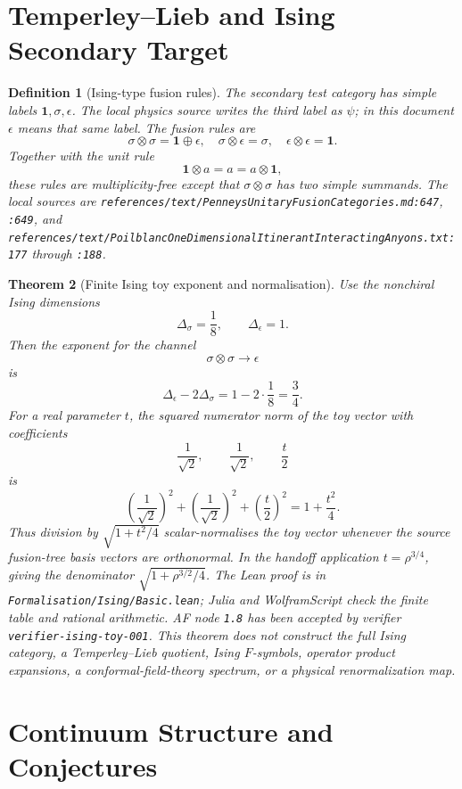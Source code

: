 \documentclass[11pt]{article}
\newtheorem{definition}{Definition}[section]
\newtheorem{theorem}[definition]{Theorem}
\begin{document}
\section{Temperley--Lieb and Ising Secondary Target}

\begin{definition}[Ising-type fusion rules]
The secondary test category has simple labels
\(\mathbf 1,\sigma,\epsilon\). The local physics source writes the third
label as \(\psi\); in this document \(\epsilon\) means that same label. The
fusion rules are
\[
\sigma\otimes\sigma=\mathbf 1\oplus\epsilon,\quad
\sigma\otimes\epsilon=\sigma,\quad
\epsilon\otimes\epsilon=\mathbf 1.
\]
Together with the unit rule
\[
\mathbf 1\otimes a=a=a\otimes \mathbf 1,
\]
these rules are multiplicity-free except that \(\sigma\otimes\sigma\) has two
simple summands. The local sources are
\texttt{references/text/PenneysUnitaryFusionCategories.md:647},
\texttt{:649}, and
\texttt{references/text/PoilblancOneDimensionalItinerantInteractingAnyons.txt:177}
through \texttt{:188}.
\end{definition}

\begin{theorem}[Finite Ising toy exponent and normalisation]
Use the nonchiral Ising dimensions
\[
\Delta_\sigma=\frac18,\qquad \Delta_\epsilon=1.
\]
Then the exponent for the channel
\[
\sigma\otimes\sigma\to\epsilon
\]
is
\[
\Delta_\epsilon-2\Delta_\sigma
=1-2\cdot\frac18=\frac34.
\]
For a real parameter \(t\), the squared numerator norm of the toy vector with
coefficients
\[
\frac{1}{\sqrt 2},\qquad
\frac{1}{\sqrt 2},\qquad
\frac{t}{2}
\]
is
\[
\left(\frac1{\sqrt2}\right)^2+
\left(\frac1{\sqrt2}\right)^2+
\left(\frac{t}{2}\right)^2
=1+\frac{t^2}{4}.
\]
Thus division by \(\sqrt{1+t^2/4}\) scalar-normalises the toy vector whenever
the source fusion-tree basis vectors are orthonormal. In the handoff
application \(t=\rho^{3/4}\), giving the denominator
\(\sqrt{1+\rho^{3/2}/4}\). The Lean proof is in
\texttt{Formalisation/Ising/Basic.lean}; Julia and WolframScript check the
finite table and rational arithmetic. AF node \texttt{1.8} has been accepted
by verifier \texttt{verifier-ising-toy-001}. This theorem does not construct
the full Ising category, a Temperley--Lieb quotient, Ising \(F\)-symbols,
operator product expansions, a conformal-field-theory spectrum, or a physical
renormalization map.
\end{theorem}

\section{Continuum Structure and Conjectures}
\end{document}
